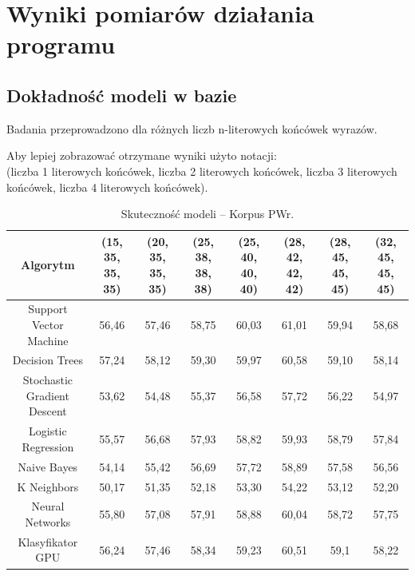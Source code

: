 \section{Wyniki pomiarów działania programu}
\subsection{Dokładność modeli w bazie}
Badania przeprowadzono dla różnych liczb n-literowych końcówek wyrazów. 
\begin{landscape}
	\noindent Aby lepiej zobrazować otrzymane wyniki użyto notacji:\\ (liczba 1 literowych końcówek, liczba 2 literowych końcówek, liczba 3 literowych końcówek, liczba 4 literowych końcówek).
	\begin{table}[H]
		\centering
		\caption{Skuteczność modeli -- Korpus PWr.}
		\begin{tabular}{cccccccc}
			\toprule
			\textbf{Algorytm} & \textbf{(15, 35, 35, 35)} & \textbf{(20, 35, 35, 35)} & \textbf{(25, 38, 38, 38)} & \textbf{(25, 40, 40, 40)} & \textbf{(28, 42, 42, 42)} & \textbf{(28, 45, 45, 45)} & \textbf{(32, 45, 45, 45)} \\
			\midrule
			Support Vector Machine & 56,46 & 57,46 & 58,75 & 60,03 & 61,01 & 59,94 & 58,68 \\
			Decision Trees & 57,24 & 58,12 & 59,30 & 59,97 & 60,58 & 59,10 & 58,14 \\
			Stochastic Gradient Descent & 53,62 & 54,48 & 55,37 & 56,58 & 57,72 & 56,22 & 54,97 \\
			Logistic Regression & 55,57 & 56,68 & 57,93 & 58,82 & 59,93 & 58,79 & 57,84 \\
			Naive Bayes & 54,14 & 55,42 & 56,69 & 57,72 & 58,89 & 57,58 & 56,56 \\
			K Neighbors & 50,17 & 51,35 & 52,18 & 53,30 & 54,22 & 53,12 & 52,20 \\
			Neural Networks & 55,80 & 57,08 & 57,91 & 58,88 & 60,04 & 58,72 & 57,75 \\ 
			Klasyfikator GPU & 56,24 & 57,46 & 58,34 & 59,23 & 60,51 & 59,1 & 58,22 \\
			\bottomrule
		\end{tabular}
	\end{table}
	

\end{landscape}
